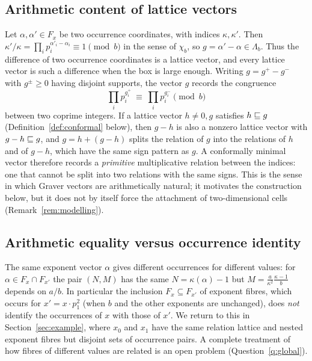 \subsection{Arithmetic content of lattice vectors}\label{sec:arith-meaning}

Let $\alpha,\alpha'\in F_x$ be two occurrence coordinates, with indices $\kappa,\kappa'$. Then $\kappa'/\kappa=\prod_ip_i^{\alpha'_i-\alpha_i}\equiv1\pmod b$ in the sense of $\chi_b$, so $g=\alpha'-\alpha\in\Lambda_b$. Thus the difference of two occurrence coordinates is a lattice vector, and every lattice vector is such a difference when the box is large enough. Writing $g=g^+-g^-$ with $g^\pm\ge0$ having disjoint supports, the vector $g$ records the congruence
\[
  \prod_ip_i^{g^+_i}\ \equiv\ \prod_ip_i^{g^-_i}\pmod b
\]
between two coprime integers. If a lattice vector $h\ne0,g$ satisfies $h\sqsubseteq g$ (Definition~\ref{def:conformal} below), then $g-h$ is also a nonzero lattice vector with $g-h\sqsubseteq g$, and $g=h+(g-h)$ splits the relation of $g$ into the relations of $h$ and of $g-h$, which have the same sign pattern as $g$. A conformally minimal vector therefore records a \emph{primitive} multiplicative relation between the indices: one that cannot be split into two relations with the same signs. This is the sense in which Graver vectors are arithmetically natural; it motivates the construction below, but it does not by itself force the attachment of two-dimensional cells (Remark~\ref{rem:modelling}).

\subsection{Arithmetic equality versus occurrence identity}

The same exponent vector $\alpha$ gives different occurrences for different values: for $\alpha\in F_x\cap F_{x'}$ the pair $(N,M)$ has the same $N=\kappa(\alpha)-1$ but $M=\frac{a}{\kappa^2}\frac{\kappa-1}{b}$ depends on $a/b$. In particular the inclusion $F_x\subseteq F_{x'}$ of exponent fibres, which occurs for $x'=x\cdot p_1^{2}$ (when $b$ and the other exponents are unchanged), does \emph{not} identify the occurrences of $x$ with those of $x'$. We return to this in Section~\ref{sec:example}, where $x_0$ and $x_1$ have the same relation lattice and nested exponent fibres but disjoint sets of occurrence pairs. A complete treatment of how fibres of different values are related is an open problem (Question~\ref{q:global}).

